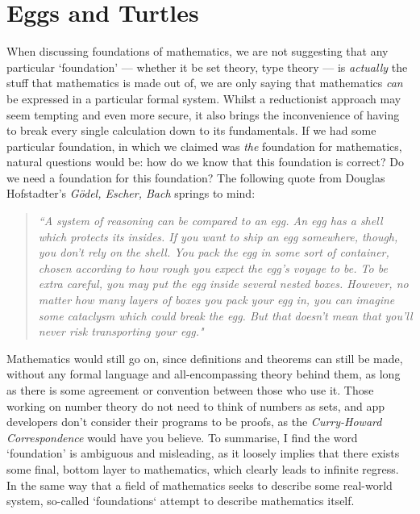 \documentclass[11pt]{report}
\theoremstyle{definition}
\theoremstyle{theorem}
\theoremstyle{lemma}
\begin{document}
\section{Eggs and Turtles}
When discussing foundations of mathematics, we are not suggesting that any particular `foundation' --- whether it be set theory, type theory --- is \emph{actually} the stuff that mathematics is made out of, we are only saying that mathematics \emph{can} be expressed in a particular formal system. 
Whilst a reductionist approach may seem tempting and even more secure, it also brings the inconvenience of having to break every single calculation down to its fundamentals.
If we had some particular foundation, in which we claimed was \emph{the} foundation for mathematics, natural questions would be: how do we know that this foundation is correct? Do we need a foundation for this foundation? 
The following quote from Douglas Hofstadter's \textit{G\"odel, Escher, Bach} springs to mind: 

\begin{quotation}
\begin{small}\textit{
``A system of reasoning can be compared to an egg. An egg has a shell
which protects its insides. If you want to ship an egg somewhere, though,
you don't rely on the shell. You pack the egg in some sort of container,
chosen according to how rough you expect the egg's voyage to be. To be
extra careful, you may put the egg inside several nested boxes. However,
no matter how many layers of boxes you pack your egg in, you can imagine
some cataclysm which could break the egg. But that doesn't mean that
you'll never risk transporting your egg."}\\
\end{small}
\end{quotation}
Mathematics would still go on, since definitions and theorems can still be made, without any formal language and all-encompassing theory behind them, as long as there is some agreement or convention between those who use it.
Those working on number theory do not need to think of numbers as sets, and app developers don't consider their programs to be proofs, as the \emph{Curry-Howard Correspondence} would have you believe. 
To summarise, I find the word `foundation' is ambiguous and misleading, as it loosely implies that there exists some final, bottom layer to mathematics, which clearly leads to infinite regress. 
In the same way that a field of mathematics seeks to describe some real-world system, so-called `foundations` attempt to describe mathematics itself.\\
\end{document}
